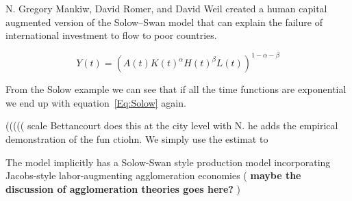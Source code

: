 




N. Gregory Mankiw, David Romer, and David Weil created a human capital augmented version of the Solow–Swan model that can explain the failure of international investment to flow to poor countries.

    \[Y(t)=(A(t)K(t)^\alpha H(t)^\beta L(t))^{1-\alpha -\beta} \]
    
    From the Solow example we can see that if all the time functions are exponential we end up with equation~\ref{Eq:Solow} again.
    
 

(((((   scale Bettancourt does this at the city level with N. he adds the empirical demonstration of the fun ctiohn. We  simply use the estimat to    

The model implicitly has a Solow-Swan style production model incorporating Jacobs-style labor-augmenting agglomeration economies (\textbf{\color{blue} maybe the discussion of agglomeration theories goes here? }) 









\color{black}
